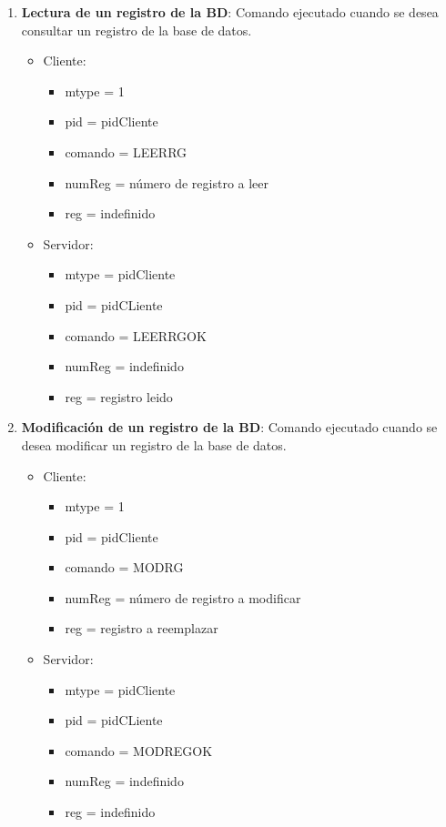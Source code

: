 \documentclass[a4paper,10pt]{article}
\begin{document}
\begin{enumerate}
\begin{itemize}
			\end{itemize}
		\item{\bf Lectura de un registro de la BD}: Comando ejecutado cuando se desea consultar un registro de la base de datos.
			\begin{itemize}
				\item Cliente:
				\begin{itemize}
					\item[]mtype = 1
					\item[]pid = pidCliente
					\item[]comando = LEERRG 
					\item[]numReg = n\'umero de registro a leer
					\item[]reg = indefinido
				\end{itemize}
				\item Servidor:
				\begin{itemize}
					\item[]mtype = pidCliente 
					\item[]pid = pidCLiente
					\item[]comando = LEERRGOK
					\item[]numReg = indefinido
					\item[]reg = registro leido
				\end{itemize}
			\end{itemize}

		\item{\bf Modificaci\'on de un registro de la BD}: Comando ejecutado cuando se desea modificar un registro de la base de datos.
			\begin{itemize}
				\item Cliente:
				\begin{itemize}
					\item[]mtype = 1
					\item[]pid = pidCliente
					\item[]comando = MODRG 
					\item[]numReg = n\'umero de registro a modificar
					\item[]reg = registro a reemplazar
				\end{itemize}
				\item Servidor:
				\begin{itemize}
					\item[]mtype = pidCliente 
					\item[]pid = pidCLiente
					\item[]comando = MODREGOK
					\item[]numReg = indefinido
					\item[]reg = indefinido
				\end{itemize}
			\end{itemize}


\end{enumerate}
\end{document}
